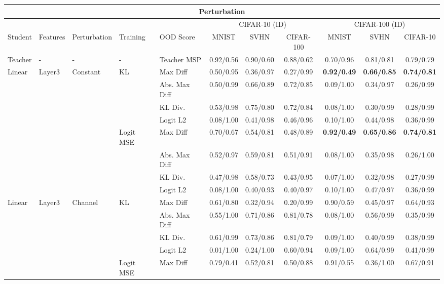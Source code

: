 \documentclass[border=2pt]{standalone}
\begin{document}
\setlength{\tabcolsep}{5pt}
\begin{tabular}{lllllcccccc}
\multicolumn{11}{c}{\textbf{Perturbation}}\\[4pt]
\toprule
 &  &  &  &  & \multicolumn{3}{c}{CIFAR-10 (ID)} & \multicolumn{3}{c}{CIFAR-100 (ID)} \\
\cmidrule(lr){6-8} \cmidrule(lr){9-11}
Student & Features & Perturbation & Training & OOD Score & MNIST & SVHN & CIFAR-100 & MNIST & SVHN & CIFAR-10 \\
\midrule
Teacher & - & - & - & Teacher MSP & 0.92/0.56 & 0.90/0.60 & 0.88/0.62 & 0.70/0.96 & 0.81/0.81 & 0.79/0.79 \\
\midrule
Linear & Layer3 & Constant & KL & Max Diff & 0.50/0.95 & 0.36/0.97 & 0.27/0.99 & \textbf{0.92/0.49} & \textbf{0.66/0.85} & \textbf{0.74/0.81} \\
 &  &  &  & Abs. Max Diff & 0.50/0.99 & 0.66/0.89 & 0.72/0.85 & 0.09/1.00 & 0.34/0.97 & 0.26/0.99 \\
 &  &  &  & KL Div. & 0.53/0.98 & 0.75/0.80 & 0.72/0.84 & 0.08/1.00 & 0.30/0.99 & 0.28/0.99 \\
 &  &  &  & Logit L2 & 0.08/1.00 & 0.41/0.98 & 0.46/0.96 & 0.10/1.00 & 0.44/0.98 & 0.36/0.99 \\
\addlinespace
 &  &  & Logit MSE & Max Diff & 0.70/0.67 & 0.54/0.81 & 0.48/0.89 & \textbf{0.92/0.49} & \textbf{0.65/0.86} & \textbf{0.74/0.81} \\
 &  &  &  & Abs. Max Diff & 0.52/0.97 & 0.59/0.81 & 0.51/0.91 & 0.08/1.00 & 0.35/0.98 & 0.26/1.00 \\
 &  &  &  & KL Div. & 0.47/0.98 & 0.58/0.73 & 0.43/0.95 & 0.07/1.00 & 0.32/0.98 & 0.27/0.99 \\
 &  &  &  & Logit L2 & 0.08/1.00 & 0.40/0.93 & 0.40/0.97 & 0.10/1.00 & 0.47/0.97 & 0.36/0.99 \\
\midrule
Linear & Layer3 & Channel & KL & Max Diff & 0.61/0.80 & 0.32/0.94 & 0.20/0.99 & 0.90/0.59 & 0.45/0.97 & 0.64/0.93 \\
 &  &  &  & Abs. Max Diff & 0.55/1.00 & 0.71/0.86 & 0.81/0.78 & 0.08/1.00 & 0.56/0.99 & 0.35/0.99 \\
 &  &  &  & KL Div. & 0.61/0.99 & 0.73/0.86 & 0.81/0.79 & 0.09/1.00 & 0.40/0.99 & 0.38/0.99 \\
 &  &  &  & Logit L2 & 0.01/1.00 & 0.24/1.00 & 0.60/0.94 & 0.09/1.00 & 0.64/0.99 & 0.41/0.99 \\
\addlinespace
 &  &  & Logit MSE & Max Diff & 0.79/0.41 & 0.52/0.81 & 0.50/0.88 & 0.91/0.55 & 0.36/1.00 & 0.67/0.91 \\

\end{tabular}
\end{document}
